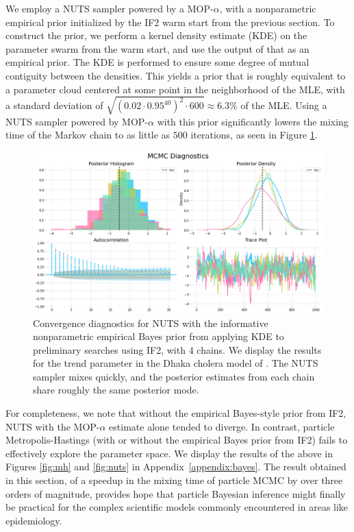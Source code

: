 \documentclass[11pt]{article}
\newcommand\arxiv[2]{#1} %
\begin{document}
We employ a NUTS sampler powered by a MOP-$\alpha$, with a nonparametric empirical prior initialized by the IF2 warm start from the previous section.
To construct the prior, we perform a kernel density estimate (KDE) on the parameter swarm from the warm start, and use the output of that as an empirical prior.
The KDE is performed to ensure some degree of mutual contiguity between the densities.
This yields a prior that is roughly equivalent to a parameter cloud centered at some point in the neighborhood of the MLE, with a standard deviation of $\sqrt{(0.02\cdot0.95^{40})^2 \cdot 600}\approx 6.3\%$ of the MLE.
Using a NUTS sampler powered by MOP-$\alpha$ with this prior significantly lowers the mixing time of the Markov chain to as little as $500$ iterations, as seen in Figure \ref{fig:nuts-eb}. 

\begin{figure}[t!]
    \centering
    \includegraphics[width=\textwidth/\real{1.25}]{../imgs/pmcmc/nuts_eb.png}
    \caption{Convergence diagnostics for NUTS with the informative nonparametric empirical Bayes prior from applying KDE to preliminary searches using IF2, with $4$ chains. We display the results for the trend parameter in the Dhaka cholera model of \cite{king08}. The NUTS sampler mixes quickly, and the posterior estimates from each chain share roughly the same posterior mode.}
    \label{fig:nuts-eb}
\end{figure}

For completeness, we note that without the empirical Bayes-style prior from IF2, NUTS with the MOP-$\alpha$ estimate alone tended to diverge.
In contrast, particle Metropolis-Hastings (with or without the empirical Bayes prior from IF2) fails to effectively explore the parameter space.
We display the results of the above in Figures \ref{fig:mh} and \ref{fig:nuts} \arxiv{in Appendix~\ref{appendix:bayes}}{within the supplementary information}. 
The result obtained in this section, of a speedup in the mixing time of particle MCMC by over three orders of magnitude, provides hope that particle Bayesian inference might finally be practical for the complex scientific models commonly encountered in areas like epidemiology.
\end{document}
